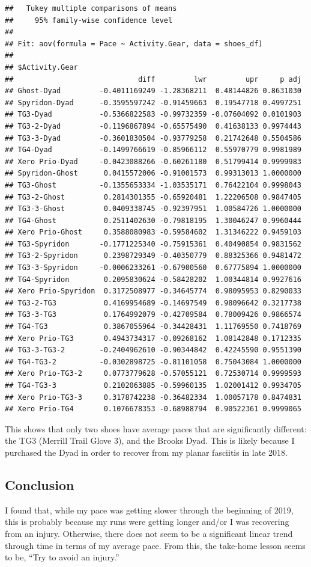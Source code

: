 \documentclass[]{article}
\begin{document}
\begin{verbatim}
##   Tukey multiple comparisons of means
##     95% family-wise confidence level
## 
## Fit: aov(formula = Pace ~ Activity.Gear, data = shoes_df)
## 
## $Activity.Gear
##                             diff         lwr         upr     p adj
## Ghost-Dyad         -0.4011169249 -1.28368211  0.48144826 0.8631030
## Spyridon-Dyad      -0.3595597242 -0.91459663  0.19547718 0.4997251
## TG3-Dyad           -0.5366822583 -0.99732359 -0.07604092 0.0101903
## TG3-2-Dyad         -0.1196867894 -0.65575490  0.41638133 0.9974443
## TG3-3-Dyad         -0.3601830504 -0.93779258  0.21742648 0.5504586
## TG4-Dyad           -0.1499766619 -0.85966112  0.55970779 0.9981989
## Xero Prio-Dyad     -0.0423088266 -0.60261180  0.51799414 0.9999983
## Spyridon-Ghost      0.0415572006 -0.91001573  0.99313013 1.0000000
## TG3-Ghost          -0.1355653334 -1.03535171  0.76422104 0.9998043
## TG3-2-Ghost         0.2814301355 -0.65920481  1.22206508 0.9847405
## TG3-3-Ghost         0.0409338745 -0.92397951  1.00584726 1.0000000
## TG4-Ghost           0.2511402630 -0.79818195  1.30046247 0.9960444
## Xero Prio-Ghost     0.3588080983 -0.59584602  1.31346222 0.9459103
## TG3-Spyridon       -0.1771225340 -0.75915361  0.40490854 0.9831562
## TG3-2-Spyridon      0.2398729349 -0.40350779  0.88325366 0.9481472
## TG3-3-Spyridon     -0.0006233261 -0.67900560  0.67775894 1.0000000
## TG4-Spyridon        0.2095830624 -0.58428202  1.00344814 0.9927616
## Xero Prio-Spyridon  0.3172508977 -0.34645774  0.98095953 0.8290033
## TG3-2-TG3           0.4169954689 -0.14697549  0.98096642 0.3217738
## TG3-3-TG3           0.1764992079 -0.42709584  0.78009426 0.9866574
## TG4-TG3             0.3867055964 -0.34428431  1.11769550 0.7418769
## Xero Prio-TG3       0.4943734317 -0.09268162  1.08142848 0.1712335
## TG3-3-TG3-2        -0.2404962610 -0.90344842  0.42245590 0.9551390
## TG4-TG3-2          -0.0302898725 -0.81101058  0.75043084 1.0000000
## Xero Prio-TG3-2     0.0773779628 -0.57055121  0.72530714 0.9999593
## TG4-TG3-3           0.2102063885 -0.59960135  1.02001412 0.9934705
## Xero Prio-TG3-3     0.3178742238 -0.36482334  1.00057178 0.8474831
## Xero Prio-TG4       0.1076678353 -0.68988794  0.90522361 0.9999065
\end{verbatim}

This shows that only two shoes have average paces that are significantly
different: the TG3 (Merrill Trail Glove 3), and the Brooks Dyad. This is
likely because I purchased the Dyad in order to recover from my planar
fasciitis in late 2018.

\hypertarget{conclusion}{%
\subsection{Conclusion}\label{conclusion}}

I found that, while my pace was getting slower through the beginning of
2019, this is probably because my runs were getting longer and/or I was
recovering from an injury. Otherwise, there does not seem to be a
significant linear trend through time in terms of my average pace. From
this, the take-home lesson seems to be, ``Try to avoid an injury.''
\end{document}
